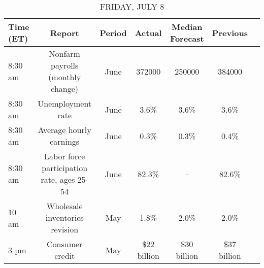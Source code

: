\documentclass{article}%
\begin{document}
%


\begin{table}[htbp]%
\caption{FRIDAY, JULY 8}%
\centering%
\begin{adjustbox}{width=1\textwidth}%
\begin{tabular}{lcccccc}
\toprule
Time (ET) &                                     Report & Period &      Actual & Median Forecast &    Previous \\
\midrule
  8:30 am &          Nonfarm payrolls (monthly change) &   June &      372000 &          250000 &      384000 \\
  8:30 am &                          Unemployment rate &   June &        3.6\% &            3.6\% &        3.6\% \\
  8:30 am &                    Average hourly earnings &   June &        0.3\% &            0.3\% &        0.4\% \\
  8:30 am & Labor force participation rate, ages 25-54 &   June &       82.3\% &              -- &       82.6\% \\
    10 am &             Wholesale inventories revision &    May &        1.8\% &            2.0\% &        2.0\% \\
     3 pm &                            Consumer credit &    May & \$22 billion &     \$30 billion & \$37 billion \\
\bottomrule
\end{tabular}
%
\end{adjustbox}%
\end{table}

%
\end{document}
